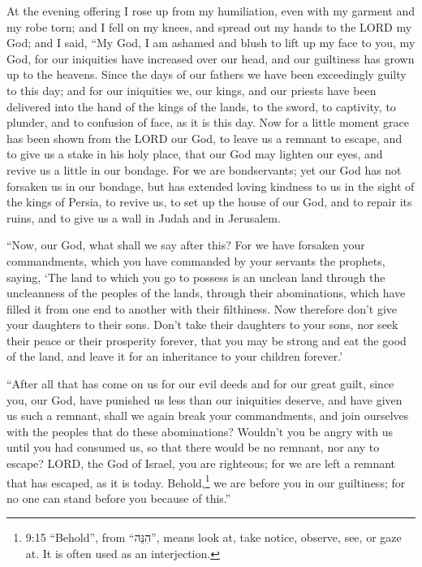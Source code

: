  At the evening offering I rose up from my humiliation, even
with my garment and my robe torn; and I fell on my knees, and spread out
my hands to the LORD my God;  and I said, ``My God, I am
ashamed and blush to lift up my face to you, my God, for our iniquities
have increased over our head, and our guiltiness has grown up to the
heavens.  Since the days of our fathers we have been
exceedingly guilty to this day; and for our iniquities we, our kings,
and our priests have been delivered into the hand of the kings of the
lands, to the sword, to captivity, to plunder, and to confusion of face,
as it is this day.  Now for a little moment grace has been
shown from the LORD our God, to leave us a remnant to escape, and to
give us a stake in his holy place, that our God may lighten our eyes,
and revive us a little in our bondage.  For we are
bondservants; yet our God has not forsaken us in our bondage, but has
extended loving kindness to us in the sight of the kings of Persia, to
revive us, to set up the house of our God, and to repair its ruins, and
to give us a wall in Judah and in Jerusalem.

 ``Now, our God, what shall we say after this? For we have
forsaken your commandments,  which you have commanded by
your servants the prophets, saying, `The land to which you go to possess
is an unclean land through the uncleanness of the peoples of the lands,
through their abominations, which have filled it from one end to another
with their filthiness.  Now therefore don't give your
daughters to their sons. Don't take their daughters to your sons, nor
seek their peace or their prosperity forever, that you may be strong and
eat the good of the land, and leave it for an inheritance to your
children forever.'

 ``After all that has come on us for our evil deeds and for
our great guilt, since you, our God, have punished us less than our
iniquities deserve, and have given us such a remnant, 
shall we again break your commandments, and join ourselves with the
peoples that do these abominations? Wouldn't you be angry with us until
you had consumed us, so that there would be no remnant, nor any to
escape?  LORD, the God of Israel, you are righteous; for we
are left a remnant that has escaped, as it is today. Behold,\footnote{9:15
  ``Behold'', from ``הִנֵּה'', means look at, take notice, observe, see,
  or gaze at. It is often used as an interjection.} we are before you in
our guiltiness; for no one can stand before you because of this.''

